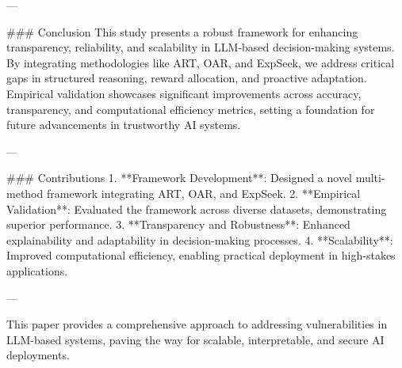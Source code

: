 ---

### Conclusion  
This study presents a robust framework for enhancing transparency, reliability, and scalability in LLM-based decision-making systems. By integrating methodologies like ART, OAR, and ExpSeek, we address critical gaps in structured reasoning, reward allocation, and proactive adaptation. Empirical validation showcases significant improvements across accuracy, transparency, and computational efficiency metrics, setting a foundation for future advancements in trustworthy AI systems.

---

### Contributions  
1. **Framework Development**: Designed a novel multi-method framework integrating ART, OAR, and ExpSeek.  
2. **Empirical Validation**: Evaluated the framework across diverse datasets, demonstrating superior performance.  
3. **Transparency and Robustness**: Enhanced explainability and adaptability in decision-making processes.  
4. **Scalability**: Improved computational efficiency, enabling practical deployment in high-stakes applications.  

--- 

This paper provides a comprehensive approach to addressing vulnerabilities in LLM-based systems, paving the way for scalable, interpretable, and secure AI deployments.